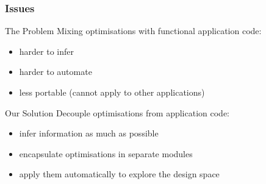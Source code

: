 \begin{frame}[fragile]
  \frametitle{Issues}
  \begin{beamerboxesrounded}{The Problem}
    Mixing optimisations with functional application code:
    \begin{itemize}
    \item harder to infer
    \item harder to automate
    \item less portable (cannot apply to other applications)
    \end{itemize}
  \end{beamerboxesrounded}
  \begin{beamerboxesrounded}{Our Solution}
    Decouple optimisations from application code:
    \begin{itemize}
    \item infer information as much as possible
    \item encapsulate optimisations in separate modules
    \item apply them automatically to explore the design space
    \end{itemize}
  \end{beamerboxesrounded}
\end{frame}
